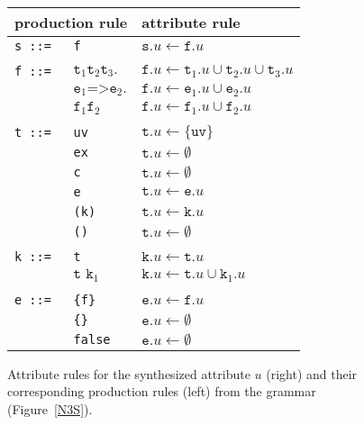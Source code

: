 \begin{figure}
\begin{tabular}{lll}
\hline
\multicolumn{2}{l}{production rule} & attribute rule\\
  \hline
\texttt{s ::=}&\texttt{f}& $\texttt{s}.u \leftarrow \texttt{f}.u$\\
       &&\\
\texttt{f ::= } &  $ \texttt{t}_1 \texttt{t}_2 \texttt{t}_3.$&   $ \texttt{f}.u \leftarrow \texttt{t}_1.u \cup \texttt{t}_2.u \cup \texttt{t}_3.u$ \\
    &  $\texttt{e}_1 \texttt{=>}  \texttt{e}_2.$& $\texttt{f}.u \leftarrow \texttt{e}_1.u \cup \texttt{e}_2.u$ \\
    & $ \texttt{f}_1 \texttt{f}_2$ &                $\texttt{f}.u \leftarrow \texttt{f}_1.u\cup \texttt{f}_2.u$ \\
&&\\
\texttt{t ::=}& \texttt{uv}\hspace{0.07\textwidth} &                $\texttt{t}.u \leftarrow\{\texttt{uv}\}$\\
            & \texttt{ex} &               $\texttt{t}.u \leftarrow \emptyset$\\
      & \texttt{c} &               $\texttt{t}.u \leftarrow\emptyset$\\
      & \texttt{e} &                $\texttt{t}.u \leftarrow\texttt{e}.u $\\
      & \texttt{(k)}& $\texttt{t}.u \leftarrow\texttt{k}.u$\\
      & \texttt{()}& $\texttt{t}.u \leftarrow\emptyset$\\
      &&\\
\texttt{k ::=}& \texttt{t}& $\texttt{k}.u \leftarrow\texttt{t}.u$\\
&$\texttt{t k}_1$ & $\texttt{k}.u \leftarrow\texttt{t}.u\cup\texttt{k}_1.u$\\
&&\\
\texttt{e ::=}&\texttt{\{f\}} &                $\texttt{e}.u \leftarrow\texttt{f}.u$\\
       &\texttt{\{\}} &  $\texttt{e}.u \leftarrow\emptyset$\\
       &\texttt{false}       &                $\texttt{e}.u \leftarrow\emptyset$\\
  \hline
\end{tabular}
\caption{Attribute rules for the synthesized attribute $u$ (right) and their corresponding production rules (left) from the \nthree grammar (Figure~\ref{N3S}).\label{EYEAT}}
\end{figure}
